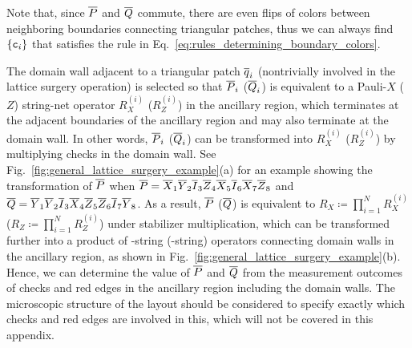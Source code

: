 \documentclass[
 prx,
 reprint,
 superscriptaddress,
 longbibliography,
 dvipsnames
]{revtex4-2}
\begin{document}
Note that, since $\overline{P}$ and $\overline{Q}$ commute, there are even flips of colors between neighboring boundaries connecting triangular patches, thus we can always find $\qty{\cbs_i}$ that satisfies the rule in Eq.~\eqref{eq:rules_determining_boundary_colors}.

The domain wall adjacent to a triangular patch $\overline{q}_{i}$ (nontrivially involved in the lattice surgery operation) is selected so that $\overline{P}_i$ ($\overline{Q}_i$) is equivalent to a Pauli-$X$ ($Z$) string-net operator $R_X^{(i)}$ ($R_Z^{(i)}$) in the ancillary region, which terminates at the adjacent boundaries of the ancillary region and may also terminate at the domain wall.
In other words, $\overline{P}_i$ ($\overline{Q}_i$) can be transformed into $R_X^{(i)}$ ($R_Z^{(i)}$) by multiplying checks in the domain wall.
See Fig.~\ref{fig:general_lattice_surgery_example}(a) for an example showing the transformation of $\overline{P}$ when $\overline{P} = \overline{X}_1\overline{Y}_2\overline{I}_3\overline{Z}_4\overline{X}_5\overline{I}_6\overline{X}_7\overline{Z}_8$ and $\overline{Q} = \overline{Y}_1\overline{Y}_2\overline{I}_3\overline{X}_4\overline{Z}_5\overline{Z}_6\overline{I}_7\overline{Y}_8$.
As a result, $\overline{P}$ ($\overline{Q}$) is equivalent to $R_{X} \coloneqq \prod_{i=1}^N R_{X}^{(i)}$ ($R_{Z} \coloneqq \prod_{i=1}^N R_{Z}^{(i)}$) under stabilizer multiplication, which can be transformed further into a product of \rx-string (\rz-string) operators connecting domain walls in the ancillary region, as shown in Fig.~\ref{fig:general_lattice_surgery_example}(b).
Hence, we can determine the value of $\overline{P}$ and $\overline{Q}$ from the measurement outcomes of checks and red edges in the ancillary region including the domain walls.
The microscopic structure of the layout should be considered to specify exactly which checks and red edges are involved in this, which will not be covered in this appendix.

\end{document}
